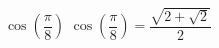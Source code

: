 {$\cos \left( \dfrac{\pi}{8} \right)$}
{$\cos \left( \dfrac{\pi}{8} \right) = \dfrac{\sqrt{2 + \sqrt{2}}}{2}$}
